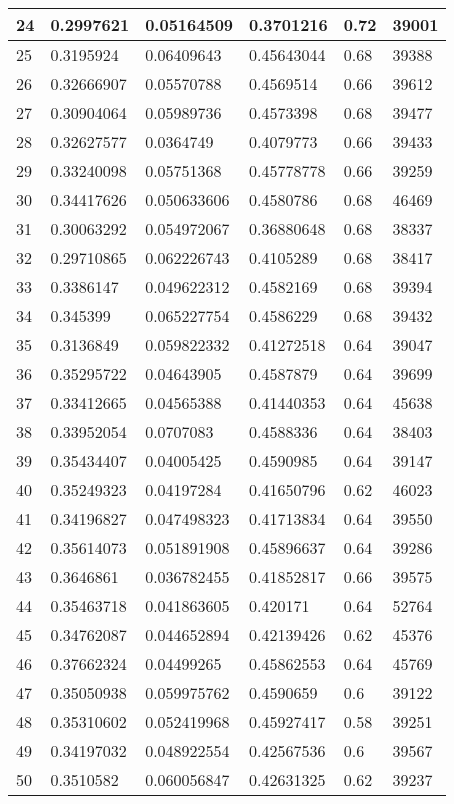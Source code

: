 \begin{longtable}{|l|l|l|l|l|l|}
24 & 0.2997621 & 0.05164509 & 0.3701216 & 0.72 & 39001 \\ \hline 
25 & 0.3195924 & 0.06409643 & 0.45643044 & 0.68 & 39388 \\ \hline 
26 & 0.32666907 & 0.05570788 & 0.4569514 & 0.66 & 39612 \\ \hline 
27 & 0.30904064 & 0.05989736 & 0.4573398 & 0.68 & 39477 \\ \hline 
28 & 0.32627577 & 0.0364749 & 0.4079773 & 0.66 & 39433 \\ \hline 
29 & 0.33240098 & 0.05751368 & 0.45778778 & 0.66 & 39259 \\ \hline 
30 & 0.34417626 & 0.050633606 & 0.4580786 & 0.68 & 46469 \\ \hline 
31 & 0.30063292 & 0.054972067 & 0.36880648 & 0.68 & 38337 \\ \hline 
32 & 0.29710865 & 0.062226743 & 0.4105289 & 0.68 & 38417 \\ \hline 
33 & 0.3386147 & 0.049622312 & 0.4582169 & 0.68 & 39394 \\ \hline 
34 & 0.345399 & 0.065227754 & 0.4586229 & 0.68 & 39432 \\ \hline 
35 & 0.3136849 & 0.059822332 & 0.41272518 & 0.64 & 39047 \\ \hline 
36 & 0.35295722 & 0.04643905 & 0.4587879 & 0.64 & 39699 \\ \hline 
37 & 0.33412665 & 0.04565388 & 0.41440353 & 0.64 & 45638 \\ \hline 
38 & 0.33952054 & 0.0707083 & 0.4588336 & 0.64 & 38403 \\ \hline 
39 & 0.35434407 & 0.04005425 & 0.4590985 & 0.64 & 39147 \\ \hline 
40 & 0.35249323 & 0.04197284 & 0.41650796 & 0.62 & 46023 \\ \hline 
41 & 0.34196827 & 0.047498323 & 0.41713834 & 0.64 & 39550 \\ \hline 
42 & 0.35614073 & 0.051891908 & 0.45896637 & 0.64 & 39286 \\ \hline 
43 & 0.3646861 & 0.036782455 & 0.41852817 & 0.66 & 39575 \\ \hline 
44 & 0.35463718 & 0.041863605 & 0.420171 & 0.64 & 52764 \\ \hline 
45 & 0.34762087 & 0.044652894 & 0.42139426 & 0.62 & 45376 \\ \hline 
46 & 0.37662324 & 0.04499265 & 0.45862553 & 0.64 & 45769 \\ \hline 
47 & 0.35050938 & 0.059975762 & 0.4590659 & 0.6 & 39122 \\ \hline 
48 & 0.35310602 & 0.052419968 & 0.45927417 & 0.58 & 39251 \\ \hline 
49 & 0.34197032 & 0.048922554 & 0.42567536 & 0.6 & 39567 \\ \hline 
50 & 0.3510582 & 0.060056847 & 0.42631325 & 0.62 & 39237 \\ \hline 
\end{longtable}